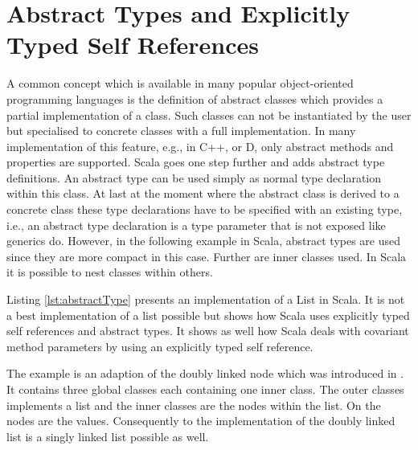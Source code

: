 \section{Abstract Types and Explicitly Typed Self References}
A common concept which is available in many popular object-oriented
programming languages is the definition of abstract classes which
provides a partial implementation of a class. Such classes can not be
instantiated by the user but specialised to concrete classes with a full
implementation.  In many implementation of this feature, e.g., in C++,
\cs or D, only abstract methods and properties are supported. Scala goes
one step further and adds abstract type definitions. An abstract type can
be used simply as normal type declaration within this class. At last at
the moment where the abstract class is derived to a concrete class these
type declarations have to be specified with an existing type, i.e.,
an abstract type declaration is a type parameter that is not exposed
like generics do. However, in the following example in Scala, abstract
types are used since they are more compact in this case. Further are
inner classes used. In Scala it is possible to nest classes within others.

Listing \ref{lst:abstractType} presents an implementation of a List
in Scala.  It is not a best implementation of a list possible but shows
how Scala uses explicitly typed self references and abstract types. It
shows as well how Scala deals with covariant method parameters by using
an explicitly typed self reference.

The example is an adaption of the doubly linked node which was introduced
in . It contains three global classes each
containing one inner class. The outer classes implements a list and
the inner classes are the nodes within the list. On the nodes are the
values. Consequently to the implementation of the doubly linked list is
a singly linked list possible as well.

